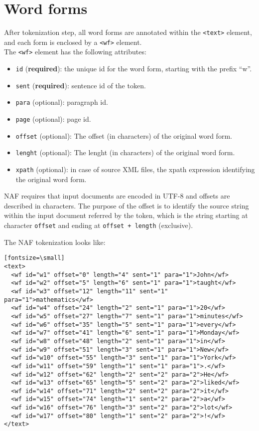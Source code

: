 
\section{Word forms}
\label{sec:word-forms}

After tokenization step, all word forms are annotated within the
\texttt{<text>} element, and each form is enclosed by a \texttt{<wf>}
element.\\

The \texttt{<wf>} element has the following attributes:
\begin{itemize}
\item \texttt{id} (\textbf{required}): the unique id for the word form,
  starting with the prefix ``w''.
\item \texttt{sent} (\textbf{required}): sentence id of the token.
\item \texttt{para} (optional): paragraph id.
\item \texttt{page} (optional): page id.
\item \texttt{offset} (optional): The offset (in characters) of the original
  word form.
\item \texttt{lenght} (optional): The lenght (in characters) of the original
  word form.
\item \texttt{xpath} (optional): in case of source XML files, the xpath
  expression identifying the original word form.
\end{itemize}

NAF requires that input documents are encoded in UTF-8 and offsets are
described in characters. The purpose of the offset is to identify the source
string within the input document referred by the token, which is the string
starting at character \texttt{offset} and ending at \texttt{offset + length}
(exclusive).

The NAF tokenization looks like:
\begin{verbatim}[fontsize=\small]
<text>
  <wf id="w1" offset="0" length="4" sent="1" para="1">John</wf>
  <wf id="w2" offset="5" length="6" sent="1" para="1">taught</wf>
  <wf id="w3" offset="12" length="11" sent="1" para="1">mathematics</wf>
  <wf id="w4" offset="24" length="2" sent="1" para="1">20</wf>
  <wf id="w5" offset="27" length="7" sent="1" para="1">minutes</wf>
  <wf id="w6" offset="35" length="5" sent="1" para="1">every</wf>
  <wf id="w7" offset="41" length="6" sent="1" para="1">Monday</wf>
  <wf id="w8" offset="48" length="2" sent="1" para="1">in</wf>
  <wf id="w9" offset="51" length="3" sent="1" para="1">New</wf>
  <wf id="w10" offset="55" length="3" sent="1" para="1">York</wf>
  <wf id="w11" offset="59" length="1" sent="1" para="1">.</wf>
  <wf id="w12" offset="62" length="2" sent="2" para="2">He</wf>
  <wf id="w13" offset="65" length="5" sent="2" para="2">liked</wf>
  <wf id="w14" offset="71" length="2" sent="2" para="2">it</wf>
  <wf id="w15" offset="74" length="1" sent="2" para="2">a</wf>
  <wf id="w16" offset="76" length="3" sent="2" para="2">lot</wf>
  <wf id="w17" offset="80" length="1" sent="2" para="2">!</wf>
</text>
\end{verbatim}


